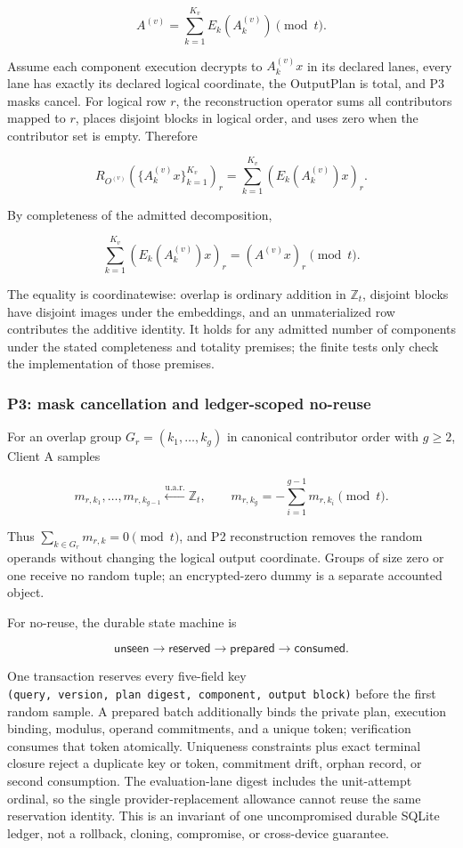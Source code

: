 \[
A^{(v)}=\sum_{k=1}^{K_v}E_k\!\left(A_k^{(v)}\right)\pmod t.
\]

Assume each component execution decrypts to \(A_k^{(v)}x\) in its declared lanes, every lane has exactly its declared logical coordinate, the OutputPlan is total, and P3 masks cancel. For logical row \(r\), the reconstruction operator sums all contributors mapped to \(r\), places disjoint blocks in logical order, and uses zero when the contributor set is empty. Therefore

\[
R_{O^{(v)}}\!\left(\{A_k^{(v)}x\}_{k=1}^{K_v}\right)_r
=\sum_{k=1}^{K_v}\left(E_k(A_k^{(v)})x\right)_r.
\]

By completeness of the admitted decomposition,

\[
\sum_{k=1}^{K_v}\left(E_k(A_k^{(v)})x\right)_r
=\left(A^{(v)}x\right)_r\pmod t.
\]

The equality is coordinatewise: overlap is ordinary addition in \(\mathbb{Z}_t\), disjoint blocks have disjoint images under the embeddings, and an unmaterialized row contributes the additive identity. It holds for any admitted number of components under the stated completeness and totality premises; the finite tests only check the implementation of those premises.

\subsubsection{P3: mask cancellation and ledger-scoped no-reuse}\label{p3-mask-cancellation-and-ledger-scoped-no-reuse}

For an overlap group \(G_r=(k_1,\ldots,k_g)\) in canonical contributor order with \(g\ge 2\), Client A samples

\[
m_{r,k_1},\ldots,m_{r,k_{g-1}}
\overset{\mathrm{u.a.r.}}{\leftarrow}\mathbb{Z}_t,
\qquad
m_{r,k_g}=-\sum_{i=1}^{g-1}m_{r,k_i}\pmod t.
\]

Thus \(\sum_{k\in G_r}m_{r,k}=0\pmod t\), and P2 reconstruction removes the random operands without changing the logical output coordinate. Groups of size zero or one receive no random tuple; an encrypted-zero dummy is a separate accounted object.

For no-reuse, the durable state machine is

\[
\textsf{unseen}\rightarrow\textsf{reserved}
\rightarrow\textsf{prepared}\rightarrow\textsf{consumed}.
\]

One transaction reserves every five-field key \texttt{(query,\ version,\ plan\ digest,\ component,\ output\ block)} before the first random sample. A prepared batch additionally binds the private plan, execution binding, modulus, operand commitments, and a unique token; verification consumes that token atomically. Uniqueness constraints plus exact terminal closure reject a duplicate key or token, commitment drift, orphan record, or second consumption. The evaluation-lane digest includes the unit-attempt ordinal, so the single provider-replacement allowance cannot reuse the same reservation identity. This is an invariant of one uncompromised durable SQLite ledger, not a rollback, cloning, compromise, or cross-device guarantee.

